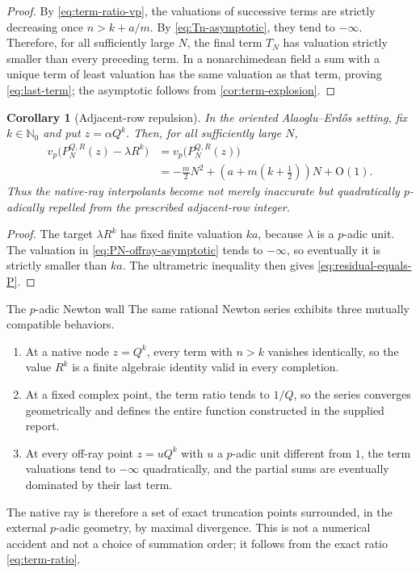 \documentclass[11pt,oneside]{article}
\newtheorem{corollary}[theorem]{Corollary}
\theoremstyle{definition}
\newcommand{\Nzero}{\mathbb N_0}
\newcommand{\vp}{v_p}
\newcommand{\bigO}{\mathrm O}
\newcommand{\AEconj}{Alaoglu--Erd\H{o}s}
\begin{document}
\begin{proof}
By \eqref{eq:term-ratio-vp}, the valuations of successive terms are strictly decreasing once
$n>k+a/m$.  By \eqref{eq:Tn-asymptotic}, they tend to $-\infty$.  Therefore, for all
sufficiently large $N$, the final term $T_N$ has valuation strictly smaller than every
preceding term.  In a nonarchimedean field a sum with a unique term of least valuation has the
same valuation as that term, proving \eqref{eq:last-term}; the asymptotic follows from
\cref{cor:term-explosion}.
\end{proof}

\begin{corollary}[Adjacent-row repulsion]\label{cor:adjacent-repulsion}
In the oriented \AEconj{} setting, fix $k\in\Nzero$ and put $z=\alpha Q^k$.  Then, for all
sufficiently large $N$,
\begin{align}
 \vp\bigl(P_N^{Q,R}(z)-\lambda R^k\bigr)
 &=\vp\bigl(P_N^{Q,R}(z)\bigr)\label{eq:residual-equals-P}\\
 &=-\frac m2N^2+
 \left(a+m\left(k+\frac12\right)\right)N+\bigO(1).
 \label{eq:adjacent-residual-asymptotic}
\end{align}
Thus the native-ray interpolants become not merely inaccurate but quadratically
$p$-adically repelled from the prescribed adjacent-row integer.
\end{corollary}

\begin{proof}
The target $\lambda R^k$ has fixed finite valuation $ka$, because $\lambda$ is a $p$-adic
unit.  The valuation in \eqref{eq:PN-offray-asymptotic} tends to $-\infty$, so eventually it
is strictly smaller than $ka$.  The ultrametric inequality then gives
\eqref{eq:residual-equals-P}.
\end{proof}

\begin{resultbox}{The $p$-adic Newton wall}
The same rational Newton series exhibits three mutually compatible behaviors.
\begin{enumerate}[label=(\roman*)]
\item At a native node $z=Q^k$, every term with $n>k$ vanishes identically, so the value
  $R^k$ is a finite algebraic identity valid in every completion.
\item At a fixed complex point, the term ratio tends to $1/Q$, so the series converges
  geometrically and defines the entire function constructed in the supplied report.
\item At every off-ray point $z=uQ^k$ with $u$ a $p$-adic unit different from $1$, the term
  valuations tend to $-\infty$ quadratically, and the partial sums are eventually dominated
  by their last term.
\end{enumerate}
The native ray is therefore a set of exact truncation points surrounded, in the external
$p$-adic geometry, by maximal divergence.  This is not a numerical accident and not a
choice of summation order; it follows from the exact ratio \eqref{eq:term-ratio}.
\end{resultbox}
\end{document}
